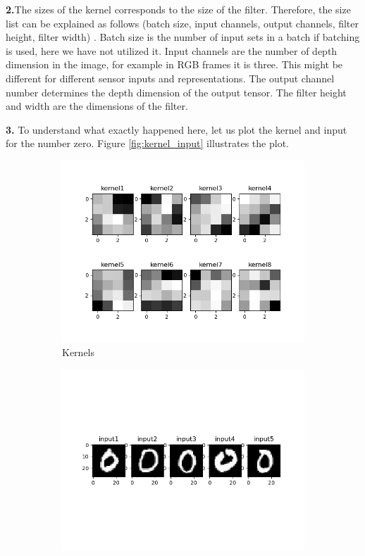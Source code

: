 \documentclass{assignment}
\begin{document}
\textbf{2.}The sizes of the kernel corresponds to the size of the filter. Therefore, the size list can be explained as follows (batch size, input channels, output channels, filter height, filter width) . Batch size is the number of input sets in a batch if batching is used, here we have not utilized it. Input channels are the number of depth dimension in the image, for example in RGB frames it is three. This might be different for different sensor inputs and representations. The output channel number determines the depth dimension of the output tensor. The filter height and width are the dimensions of the filter.

\textbf{3.}
To understand what exactly happened here, let us plot the kernel and input for the number zero. Figure \ref{fig:kernel_input} illustrates the plot.

\begin{figure}[htbp!]
    \begin{subfigure}{0.5\textwidth}
        \includegraphics[width=\textwidth]{figures/q2_kernels.png}
        \caption{Kernels}
    \end{subfigure}\hfill
    \begin{subfigure}{0.5\textwidth}
        \includegraphics[width=\textwidth]{figures/q2_zero_input.png}

\end{subfigure}
\end{figure}
\end{document}
